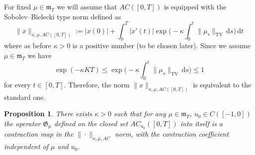 \documentclass[reqno]{amsart}
\theoremstyle{plain}
\newtheorem{proposition}{Proposition}[section]
\numberwithin{equation}{section}
\numberwithin{definition}{section}
\newcommand{\dd}{\ensuremath{\mathrm{d}}}
\begin{document}
For fixed $\mu\in\mathfrak{m}_T$ we will assume that $AC([0,T])$ is equipped with the Sobolev--Bielecki type norm defined as 
\begin{equation*}
    \| x \|_{\kappa,\mu, AC([0,T])} := |x(0)| + \int_{0}^T |x'(t)| \exp\Big(-\kappa \int_0^t \|\mu_s\|_{\mathrm{TV}}\,\dd s\Big)\,  \dd t 
\end{equation*}
where as before $\kappa > 0$ is a positive number (to be chosen later). Since we assume $\mu\in \mathfrak{m}_T$ we have 
\begin{equation*}
    \exp(-\kappa K T)\le \exp\Big(-\kappa \int_0^t \|\mu_s\|_{\mathrm{TV}}\,\dd s \Big)\le 1 
\end{equation*}
for every $t\in[0,T]$. Therefore, the norm $\| x \|_{\kappa,\mu, AC([0,T])}$ is equivalent to the standard one. 
\begin{proposition}
\label{prop:contraction-ODEs-on-AC}
There exists $\kappa > 0$ such that for any $\mu\in \mathfrak{m}_T$, $u_0 \in C([-1, 0])$ the operator $\mathfrak{G}_{\mu}$ defined on the closed set $AC_{u_0}([0,T])$ into itself is a contraction map in the $\|\cdot\|_{\kappa, \mu, AC}$ norm, with the contraction coefficient independent of $\mu$ and $u_0$.
\end{proposition}
\end{document}
